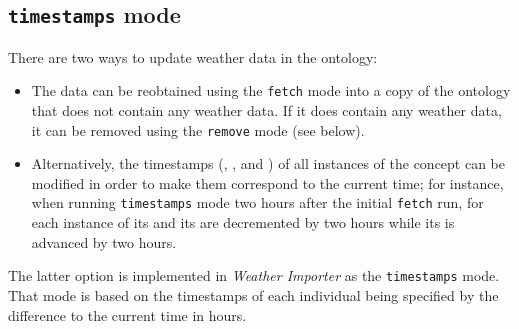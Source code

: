\subsection{\texttt{timestamps} mode}

There are two ways to update weather data in the \smarthomeweather ontology:
\begin{itemize}
  \item The data can be reobtained using the \texttt{fetch} mode into a copy of the ontology that does not contain any weather data. If it does contain any weather data, it can be removed using the \texttt{remove} mode (see below).
  \item Alternatively, the timestamps (, , and ) of all instances of the concept  can be modified in order to make them correspond to the current time; for instance, when running \texttt{timestamps} mode two hours after the initial \texttt{fetch} run, for each instance of  its  and its  are decremented by two hours while its  is advanced by two hours.
\end{itemize}

The latter option is implemented in \emph{Weather Importer} as the \texttt{timestamps} mode. That mode is based on the timestamps of each  individual being specified by the difference to the current time in hours.

